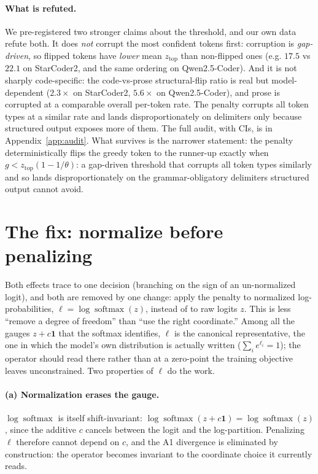 \documentclass[11pt]{article}
\newcommand{\ztop}{z_{\mathrm{top}}}
\newcommand{\thp}{\theta}
\newcommand{\softmax}{\operatorname{softmax}}
\begin{document}
\paragraph{What is refuted.}\label{sec:a2-refuted} We pre-registered two stronger claims about the threshold, and our
own data refute both. It does \emph{not} corrupt the most confident tokens first: corruption is
\emph{gap-driven}, so flipped tokens have \emph{lower} mean $\ztop$ than non-flipped ones (e.g.
$17.5$ vs $22.1$ on StarCoder2, and the same ordering on Qwen2.5-Coder). And it is not sharply
code-specific: the code-vs-prose structural-flip ratio is real but model-dependent ($2.3\times$
on StarCoder2, $5.6\times$ on Qwen2.5-Coder), and prose is corrupted at a comparable overall
per-token rate. The penalty corrupts all token types at a similar rate and lands disproportionately on
delimiters only because structured output exposes more of them. The full audit, with CIs, is in
Appendix~\ref{app:audit}. What survives is the narrower statement: the penalty
deterministically flips the greedy token to the runner-up exactly when $g < \ztop(1-1/\thp)$: a
gap-driven threshold that corrupts all token types similarly and so lands disproportionately on
the grammar-obligatory delimiters structured output cannot avoid.

\section{The fix: normalize before penalizing}
\label{sec:fix}

Both effects trace to one decision (branching on the sign of an un-normalized logit), and
both are removed by one change: apply the penalty to normalized log-probabilities,
$\ell = \log\softmax(z)$, instead of to raw logits $z$. This is less ``remove a degree of
freedom'' than ``use the right coordinate.'' Among all the gauges $z+c\mathbf{1}$ that the
softmax identifies, $\ell$ is the canonical representative, the one in which the model's own
distribution is actually written ($\sum_i e^{\ell_i}=1$); the operator should read there rather
than at a zero-point the training objective leaves unconstrained. Two properties of $\ell$ do the work.

\paragraph{(a) Normalization erases the gauge.} $\log\softmax$ is itself shift-invariant:
$\log\softmax(z + c\mathbf{1}) = \log\softmax(z)$, since the additive $c$ cancels between
the logit and the log-partition. Penalizing $\ell$ therefore cannot depend on $c$, and the
A1 divergence is eliminated by construction: the operator becomes invariant to the
coordinate choice it currently reads.
\end{document}
